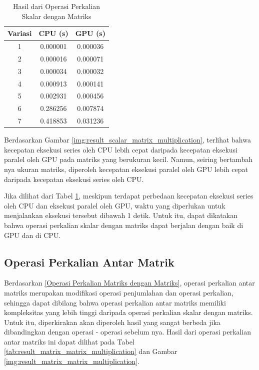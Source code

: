 \begin{table}[H]
	\centering
	\caption{Hasil dari Operasi Perkalian Skalar dengan Matriks}
	\label{tab:result_scalar_matrix_multiplication}
	\begin{tabular}{ccc}
		\toprule
		Variasi & CPU (s)  & GPU (s)  \\
		\midrule
		1       & 0.000001 & 0.000036 \\
		2       & 0.000016 & 0.000071 \\
		3       & 0.000034 & 0.000032 \\
		4       & 0.000913 & 0.000141 \\
		5       & 0.002931 & 0.000456 \\
		6       & 0.286256 & 0.007874 \\
		7       & 0.418853 & 0.031236 \\
		\bottomrule
	\end{tabular}
\end{table}

Berdasarkan Gambar \ref{img:result_scalar_matrix_multiplication}, terlihat bahwa kecepatan eksekusi series oleh CPU lebih cepat daripada kecepatan eksekusi paralel oleh GPU pada matriks yang berukuran kecil. Namun, seiring bertambah nya ukuran matriks, diperoleh kecepatan eksekusi paralel oleh GPU lebih cepat daripada kecepatan eksekusi series oleh CPU.

Jika dilihat dari Tabel \ref{tab:result_scalar_matrix_multiplication}, meskipun terdapat perbedaan kecepatan eksekusi series oleh CPU dan eksekusi paralel oleh GPU, waktu yang diperlukan untuk menjalankan eksekusi tersebut dibawah 1 detik. Untuk itu, dapat dikatakan bahwa operasi perkalian skalar dengan matriks dapat berjalan dengan baik di GPU dan di CPU.

\subsection{Operasi Perkalian Antar Matrik}

Berdasarkan \ref{Operasi Perkalian Matriks dengan Matriks}, operasi perkalian antar matriks merupakan modifikasi operasi penjumlahan dan operasi perkalian, sehingga dapat dibilang bahwa operasi perkalian antar matriks memiliki kompleksitas yang lebih tinggi daripada operasi perkalian skalar dengan matriks. Untuk itu, diperkirakan akan diperoleh hasil yang sangat berbeda jika dibandingkan dengan operasi - operasi sebelum nya. Hasil dari operasi perkalian antar matriks ini dapat dilihat pada Tabel \ref{tab:result_matrix_matrix_multiplication} dan Gambar \ref{img:result_matrix_matrix_multiplication}.

